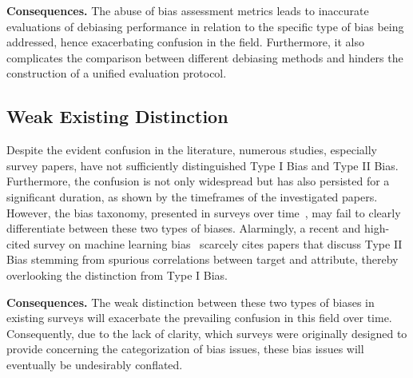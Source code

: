 \noindent
\textbf{Consequences.}
The abuse of bias assessment metrics leads to inaccurate evaluations of debiasing performance in relation to the specific type of bias being addressed, hence exacerbating confusion in the field.
Furthermore, it also complicates the comparison between different debiasing methods and hinders the construction of a unified evaluation protocol.













\subsection{Weak Existing Distinction}
Despite the evident confusion in the literature, numerous studies, especially survey papers, have not sufficiently distinguished Type I Bias and Type II Bias. 
Furthermore, the confusion is not only widespread but has also persisted for a significant duration, as shown by the timeframes of the investigated papers.
However, the bias taxonomy, presented in surveys over time~\cite{causal_based_fairness,MLbias_survey,datasets_ML}, may fail to clearly differentiate between these two types of biases. 
Alarmingly, a recent and high-cited survey on machine learning bias~\cite{MLbias_survey} scarcely cites papers that discuss Type II Bias stemming from spurious correlations between target and attribute, thereby overlooking the distinction from Type I Bias.

 
 

\noindent
\textbf{Consequences.} 
The weak distinction between these two types of biases in existing surveys will exacerbate the prevailing confusion in this field over time. 
Consequently, due to the lack of clarity, which surveys were originally designed to provide concerning the categorization of bias issues, these bias issues will eventually be undesirably conflated.

